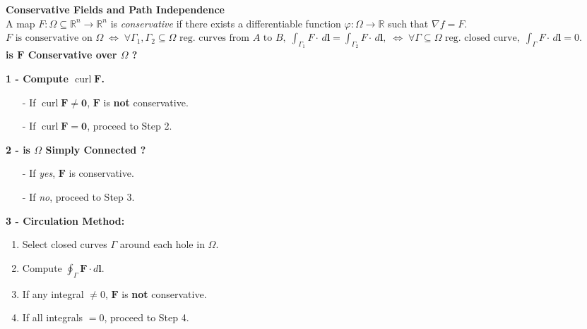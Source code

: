 \documentclass[8pt]{article}
\begin{document}
\noindent \textbf{Conservative Fields and Path Independence}\\
A map \( F : \Omega \subseteq \mathbb{R}^n \to \mathbb{R}^n \) is \emph{conservative} if there exists a differentiable function \( \varphi : \Omega \to \mathbb{R} \) such that \( \nabla f = F \).\\
\small
$
F \text{ is conservative on } \Omega \; \iff \;
\forall \Gamma_1, \Gamma_2 \subseteq \Omega \text{ reg. curves from } A \text{ to } B, \; \int_{\Gamma_1} F \cdot \, d\mathbf{l} = \int_{\Gamma_2} F \cdot \, d\mathbf{l}, \;
\iff \; \forall \Gamma \subseteq \Omega \text{ reg. closed curve}, \; \int_{\Gamma} F \cdot \, d\mathbf{l} = 0.
$\\
\normalsize
\noindent\textbf{is $\mathbf{F}$ Conservative over $\Omega$ ?}\newline
\begin{minipage}[t]{0.17\textwidth}
    \noindent\textbf{1 - Compute $\operatorname{curl} \mathbf{F}$.} \vspace{-8px}
    \begin{itemize}[leftmargin=*]
        \setlength\itemsep{-4px}
        \item[-] If $\operatorname{curl} \mathbf{F} \neq \mathbf{0}$, $\mathbf{F}$ is \textbf{not} conservative.
        \item[-] If $\operatorname{curl} \mathbf{F} = \mathbf{0}$, proceed to Step 2.
    \end{itemize}
\end{minipage}
\hfill
\begin{minipage}[t]{0.25\textwidth}
    \noindent\textbf{2 - is $\Omega$ Simply Connected ?} \vspace{-8px}
    \begin{itemize}[leftmargin=*]
        \setlength\itemsep{-4px}
        \item[-] If \textit{yes}, $\mathbf{F}$ is conservative.
        \item[-] If \textit{no}, proceed to Step 3.
    \end{itemize}
\end{minipage}
\hfill
\begin{minipage}[t]{0.23\textwidth}
    \noindent\textbf{3 - Circulation Method:} \vspace{-8px}

    \begin{enumerate}[leftmargin=*]
        \setlength\itemsep{-4px}
        \item Select closed curves $\Gamma$ around each hole in $\Omega$.
        \item Compute $\oint_{\Gamma} \mathbf{F} \cdot d\mathbf{l}$.
        \item If any integral $\neq 0$, $\mathbf{F}$ is \textbf{not} conservative.
        \item If all integrals $=0$, proceed to Step 4.
    \end{enumerate}
\end{minipage}
\end{document}
